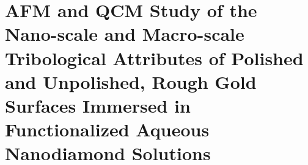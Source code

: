 \chapter{AFM and QCM Study of the Nano-scale and Macro-scale Tribological Attributes of Polished and Unpolished, Rough Gold Surfaces Immersed in Functionalized Aqueous Nanodiamond Solutions}
\label{chap-six}










